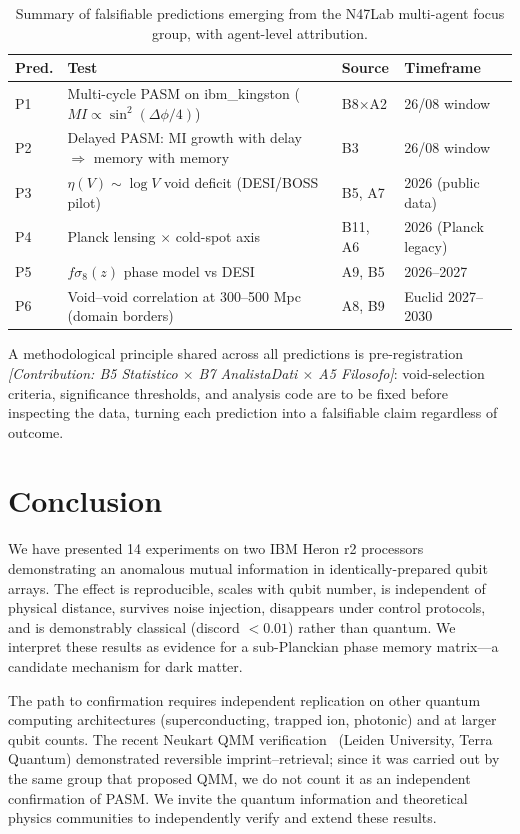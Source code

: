 ﻿\documentclass[12pt,a4paper]{article}
\begin{document}
\begin{table}[h]
\centering
\small
\begin{tabular}{p{}p{}p{}p{}}
\toprule
\textbf{Pred.} & \textbf{Test} & \textbf{Source} & \textbf{Timeframe} \\
\midrule
P1 & Multi-cycle PASM on ibm\_kingston ($MI \propto \sin^2(\Delta\phi/4)$) & B8$\times$A2 & 26/08 window \\
P2 & Delayed PASM: MI growth with delay $\Rightarrow$ memory with memory & B3 & 26/08 window \\
P3 & $\eta(V) \sim \log V$ void deficit (DESI/BOSS pilot) & B5, A7 & 2026 (public data) \\
P4 & Planck lensing $\times$ cold-spot axis & B11, A6 & 2026 (Planck legacy) \\
P5 & $f\sigma_8(z)$ phase model vs DESI & A9, B5 & 2026--2027 \\
P6 & Void--void correlation at 300--500 Mpc (domain borders) & A8, B9 & Euclid 2027--2030 \\
\bottomrule
\end{tabular}
\caption{Summary of falsifiable predictions emerging from the N47Lab multi-agent focus group, with agent-level attribution.}
\label{tab:predictions}
\end{table}

A methodological principle shared across all predictions is pre-registration \textit{[Contribution: B5 Statistico $\times$ B7 AnalistaDati $\times$ A5 Filosofo]}: void-selection criteria, significance thresholds, and analysis code are to be fixed before inspecting the data, turning each prediction into a falsifiable claim regardless of outcome.

\section{Conclusion}
\label{sec:conclusion}

We have presented 14 experiments on two IBM Heron r2 processors demonstrating an anomalous mutual information in identically-prepared qubit arrays. The effect is reproducible, scales with qubit number, is independent of physical distance, survives noise injection, disappears under control protocols, and is demonstrably classical (discord $< 0.01$) rather than quantum. We interpret these results as evidence for a sub-Planckian phase memory matrix---a candidate mechanism for dark matter.

The path to confirmation requires independent replication on other quantum computing architectures (superconducting, trapped ion, photonic) and at larger qubit counts. The recent Neukart QMM verification~\cite{neukart2026qip} (Leiden University, Terra Quantum) demonstrated reversible imprint--retrieval; since it was carried out by the same group that proposed QMM, we do not count it as an independent confirmation of PASM. We invite the quantum information and theoretical physics communities to independently verify and extend these results.
\end{document}
